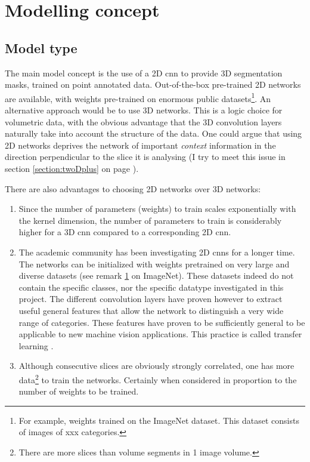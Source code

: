 \section{Modelling concept\label{sec:model_concept}}

\subsection{Model type}

The main model concept is the use of a 2D \acrfull{cnn} to provide 3D segmentation masks, trained on point annotated data.
Out-of-the-box pre-trained 2D networks are available, with weights pre-trained on enormous public datasets\footnote{\label{footnote:Imagenet}For example, weights trained on the ImageNet dataset. 
This dataset consists of  images of xxx categories.}.
An alternative approach would be to use 3D networks. This is a logic choice for volumetric data, with the obvious advantage that the 3D convolution layers naturally take into account the structure of the data.
One could argue that using 2D networks deprives the network of important \textit{context} information in the direction perpendicular to the slice it is analysing (I try to meet this issue in section \ref{section:twoDplus} on page \pageref{section:twoDplus}). 

There are also advantages to choosing 2D networks over 3D networks:
\begin{enumerate}
    \item Since the number of parameters (weights) to train scales exponentially with the kernel dimension, the number of parameters to train is considerably higher for a 3D \acrshort{cnn} compared to a corresponding 2D \acrshort{cnn}.
    \item The academic community has been investigating 2D \acrlong{cnn}s for a longer time. The networks can be initialized with weights pretrained on very large and diverse datasets (see remark \ref{footnote:Imagenet} on ImageNet). 
    These datasets indeed do not contain the specific classes, nor the specific datatype investigated in this project. 
    The different convolution layers have proven however to extract useful general features that allow the network to distinguish a very wide range of categories. 
    These features have proven to be sufficiently general to be applicable to new machine vision applications. This practice is called transfer learning .
    \item Although consecutive slices are obviously strongly correlated, one has more data\footnote{There are more slices than volume segments in 1 image volume.} to train the networks. Certainly when considered in proportion to the number of weights to be trained.
\end{enumerate}

